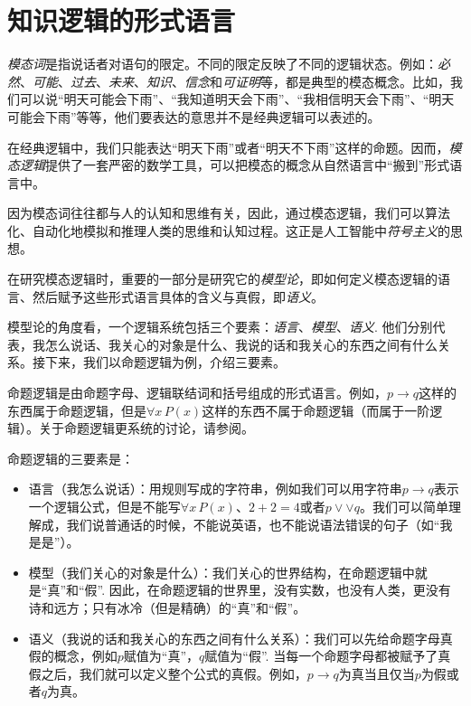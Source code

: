 \section{知识逻辑的形式语言}

\emph{模态词}是指说话者对语句的限定。不同的限定反映了不同的逻辑状态。例如：\emph{必然}、\emph{可能}、\emph{过去}、\emph{未来}、\emph{知识}、\emph{信念}和\emph{可证明}等，都是典型的模态概念。比如，我们可以说“明天可能会下雨”、“我知道明天会下雨”、“我相信明天会下雨”、“明天可能会下雨”等等，他们要表达的意思并不是经典逻辑可以表述的。

在经典逻辑中，我们只能表达“明天下雨”或者“明天不下雨”这样的命题。因而，\emph{模态逻辑}提供了一套严密的数学工具，可以把模态的概念从自然语言中“搬到”形式语言中。

因为模态词往往都与人的认知和思维有关，因此，通过模态逻辑，我们可以算法化、自动化地模拟和推理人类的思维和认知过程。这正是人工智能中\emph{符号主义}的思想。

在研究模态逻辑时，重要的一部分是研究它的\emph{模型论}，即如何定义模态逻辑的语言、然后赋予这些形式语言具体的含义与真假，即\emph{语义}。

模型论的角度看，一个逻辑系统包括三个要素：\emph{语言}、\emph{模型}、\emph{语义}. 他们分别代表，我怎么说话、我关心的对象是什么、我说的话和我关心的东西之间有什么关系。接下来，我们以命题逻辑为例，介绍三要素。

\begin{example}[命题逻辑的逻辑三要素]
命题逻辑是由命题字母、逻辑联结词和括号组成的形式语言。例如，$p\to q$这样的东西属于命题逻辑，但是$\forall x\, P(x)$这样的东西不属于命题逻辑（而属于一阶逻辑）。关于命题逻辑更系统的讨论，请参阅。

命题逻辑的三要素是：

\begin{itemize}
    \item 语言（我怎么说话）：用规则写成的字符串，例如我们可以用字符串$p\to q$表示一个逻辑公式，但是不能写$\forall x\, P(x)$、$2+2=4$或者$p\vee\vee q$。我们可以简单理解成，我们说普通话的时候，不能说英语，也不能说语法错误的句子（如“我是是”）。
    \item 模型（我们关心的对象是什么）：我们关心的世界结构，在命题逻辑中就是“真”和“假”. 因此，在命题逻辑的世界里，没有实数，也没有人类，更没有诗和远方；只有冰冷（但是精确）的“真”和“假”。
    \item 语义（我说的话和我关心的东西之间有什么关系）：我们可以先给命题字母真假的概念，例如$p$赋值为“真”，$q$赋值为“假”. 当每一个命题字母都被赋予了真假之后，我们就可以定义整个公式的真假。例如，$p\to q$为真当且仅当$p$为假或者$q$为真。
\end{itemize}
\end{example}

